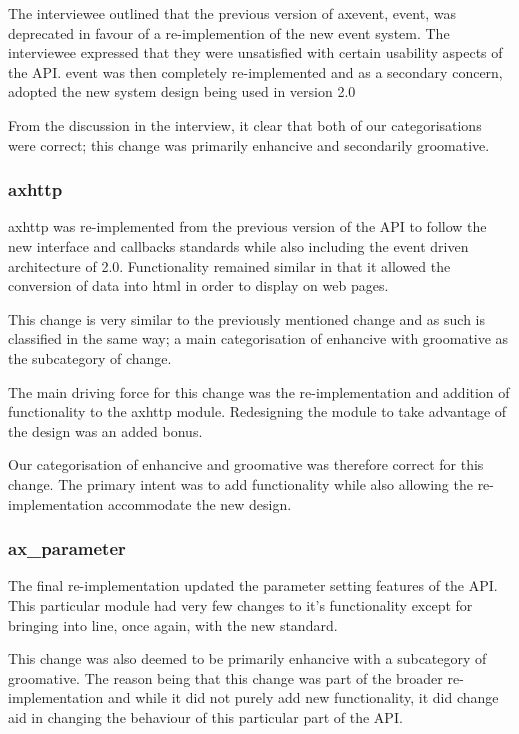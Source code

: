 \documentclass{sig-alternate}
\begin{document}
The interviewee outlined that the previous version of axevent, event, was deprecated in favour of a re-implemention of the new event system. The interviewee expressed that they were unsatisfied with certain usability aspects of the API. event was then completely re-implemented and as a secondary concern, adopted the new system design being used in version 2.0

From the discussion in the interview, it clear that both of our categorisations were correct; this change was primarily enhancive and secondarily groomative.

\subsubsection{axhttp}

axhttp was re-implemented from the previous version of the API to follow the new interface and callbacks standards while also including the event driven architecture of 2.0. Functionality remained similar in that it allowed the conversion of data into html in order to display on web pages. 

This change is very similar to the previously mentioned change and as such is classified in the same way; a main categorisation of enhancive with groomative as the subcategory of change.

The main driving force for this change was the re-implementation and addition of functionality to the axhttp module. Redesigning the module to take advantage of the design was an added bonus.

Our categorisation of enhancive and groomative was therefore correct for this change. The primary intent was to add functionality while also allowing the re-implementation accommodate the new design. 

\subsubsection{ax\_parameter}

The final re-implementation updated the parameter setting features of the API. This particular module had very few changes to it's functionality except for bringing into line, once again, with the new standard.

This change was also deemed to be primarily enhancive with a subcategory of groomative. The reason being that this change was part of the broader re-implementation and while it did not purely add new functionality, it did change aid in changing the behaviour of this particular part of the API.
\end{document}
